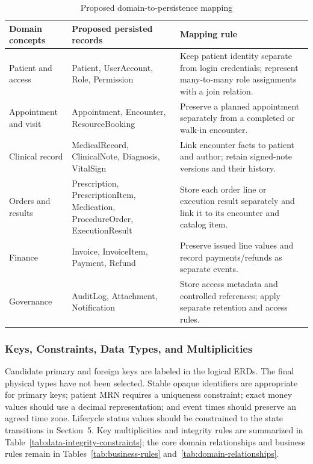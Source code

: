 \documentclass[a4paper,12pt]{article}
\begin{document}
\begin{table}[H]
\centering
\small
\renewcommand{\arraystretch}{1.12}
\begin{tabularx}{\textwidth}{@{}P{0.29\textwidth}P{0.28\textwidth}Y@{}}
\toprule
Domain concepts & Proposed persisted records & Mapping rule \\
\midrule
Patient and access & Patient, UserAccount, Role, Permission & Keep patient identity separate from login credentials; represent many-to-many role assignments with a join relation. \\
Appointment and visit & Appointment, Encounter, ResourceBooking & Preserve a planned appointment separately from a completed or walk-in encounter. \\
Clinical record & MedicalRecord, ClinicalNote, Diagnosis, VitalSign & Link encounter facts to patient and author; retain signed-note versions and their history. \\
Orders and results & Prescription, PrescriptionItem, Medication, ProcedureOrder, ExecutionResult & Store each order line or execution result separately and link it to its encounter and catalog item. \\
Finance & Invoice, InvoiceItem, Payment, Refund & Preserve issued line values and record payments/refunds as separate events. \\
Governance & AuditLog, Attachment, Notification & Store access metadata and controlled references; apply separate retention and access rules. \\
\bottomrule
\end{tabularx}
\caption{Proposed domain-to-persistence mapping}
\label{tab:persistent-mapping}
\end{table}

\subsubsection{Keys, Constraints, Data Types, and Multiplicities}

Candidate primary and foreign keys are labeled in the logical ERDs. The final physical types have not been selected. Stable opaque identifiers are appropriate for primary keys; patient MRN requires a uniqueness constraint; exact money values should use a decimal representation; and event times should preserve an agreed time zone. Lifecycle status values should be constrained to the state transitions in Section~5. Key multiplicities and integrity rules are summarized in Table~\ref{tab:data-integrity-constraints}; the core domain relationships and business rules remain in Tables~\ref{tab:business-rules} and~\ref{tab:domain-relationships}.
\end{document}
